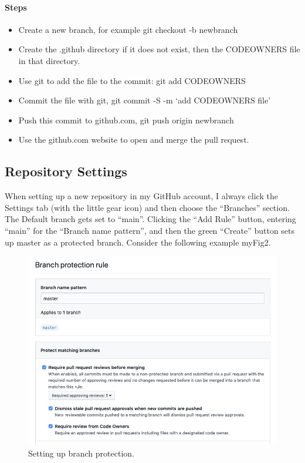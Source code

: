 \hypertarget{steps-4}{%
      \paragraph{Steps}\label{steps-4}}

\begin{itemize}
      \item
            Create a new branch, for example git checkout -b newbranch
      \item
            Create the .github directory if it does not exist, then the CODEOWNERS
            file in that directory.
      \item
            Use git to add the file to the commit: git add CODEOWNERS
      \item
            Commit the file with git, git commit -S -m `add CODEOWNERS file'
      \item
            Push this commit to github.com, git push origin newbranch
      \item
            Use the github.com website to open and merge the pull request.
\end{itemize}
\subsection{Repository Settings}
\justify{}
When setting up a new repository in my GitHub account, I always click
the Settings tab (with the little gear icon) and then choose the
``Branches'' section. The Default branch gets set to ``main''. Clicking
the ``Add Rule'' button, entering ``main'' for the ``Branch name pattern'',
and then the green ``Create'' button sets up master as a protected branch.
Consider the following example {myFig2}.
\begin{figure}
      \includegraphics[scale=0.50]{images/github-branch-protection.png}
      \caption{Setting up branch protection.}
      \label{branchprotect}
\end{figure}

